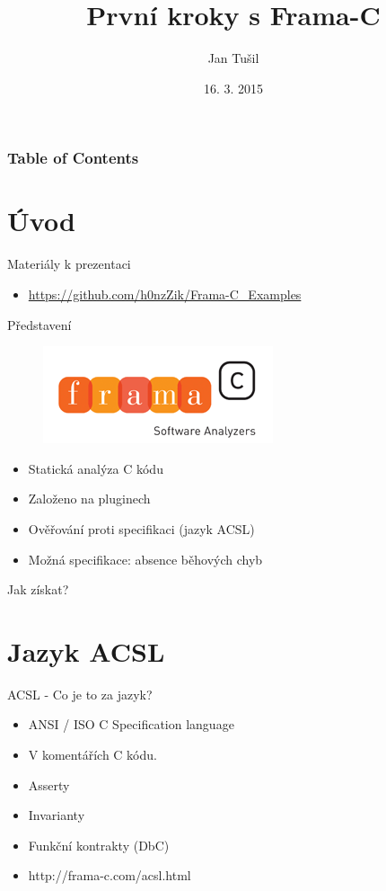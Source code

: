 \documentclass[11pt]{beamer}
\author{Jan Tušil}
\title{První kroky s Frama-C}
\date{16. 3. 2015}
\begin{document}
\begin{frame}
\titlepage
\end{frame}

\begin{frame}
\frametitle{Table of Contents}
\tableofcontents[]
\end{frame}

\section{Úvod}

\begin{frame}{Materiály k prezentaci}
\begin{itemize}
	\item \url{https://github.com/h0nzZik/Frama-C_Examples}
\end{itemize}
\end{frame}

\begin{frame}{Představení}

\begin{figure}
	\includegraphics[scale=0.3]{frama-c.png}
\end{figure}

\begin{itemize}
	\item Statická analýza C kódu
	\item Založeno na pluginech
	\item Ověřování proti specifikaci (jazyk ACSL)
	\item Možná specifikace: absence běhových chyb
\end{itemize}

\end{frame}

\begin{frame}{Jak získat?}

\end{frame}


\section{Jazyk ACSL}

\begin{frame}{ACSL - Co je to za jazyk?}
\begin{itemize}
	\item ANSI / ISO C Specification language
	\item V komentářích C kódu.
	\item Asserty
	\item Invarianty
	\item Funkční kontrakty (DbC)
	\item http://frama-c.com/acsl.html
\end{itemize}
\end{frame}
\end{document}
